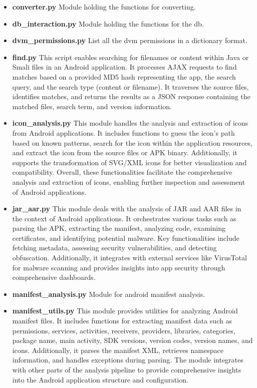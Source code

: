\documentclass{report}
\begin{document}
\begin{itemize}
\begin{itemize}
\begin{itemize}
                    \item \textbf{converter.py}
                    Module holding the functions for converting.
                    \item \textbf{db\_interaction.py}
                    Module holding the functions for the db.
                    \item \textbf{dvm\_permissions.py}
                    List all the dvm permissions in a dictionary format.
                    \item \textbf{find.py}
                    This script enables searching for filenames or content within Java or Smali files in an Android application. It processes AJAX requests to find matches based on a provided MD5 hash representing the app, the search query, and the search type (content or filename). It traverses the source files, identifies matches, and returns the results as a JSON response containing the matched files, search term, and version information.
                    \item \textbf{icon\_analysis.py}
                    This module handles the analysis and extraction of icons from Android applications. It includes functions to guess the icon's path based on known patterns, search for the icon within the application resources, and extract the icon from the source files or APK binary. Additionally, it supports the transformation of SVG/XML icons for better visualization and compatibility. Overall, these functionalities facilitate the comprehensive analysis and extraction of icons, enabling further inspection and assessment of Android applications.
                    \item \textbf{jar\_aar.py}
                    This module deals with the analysis of JAR and AAR files in the context of Android applications. It orchestrates various tasks such as parsing the APK, extracting the manifest, analyzing code, examining certificates, and identifying potential malware. Key functionalities include fetching metadata, assessing security vulnerabilities, and detecting obfuscation. Additionally, it integrates with external services like VirusTotal for malware scanning and provides insights into app security through comprehensive dashboards.
                    \item \textbf{manifest\_analysis.py}
                    Module for android manifest analysis.
                    \item \textbf{manifest\_utils.py}
                    This module provides utilities for analyzing Android manifest files. It includes functions for extracting manifest data such as permissions, services, activities, receivers, providers, libraries, categories, package name, main activity, SDK versions, version codes, version names, and icons. Additionally, it parses the manifest XML, retrieves namespace information, and handles exceptions during parsing. The module integrates with other parts of the analysis pipeline to provide comprehensive insights into the Android application structure and configuration.

\end{itemize}
\end{itemize}
\end{itemize}
\end{document}
